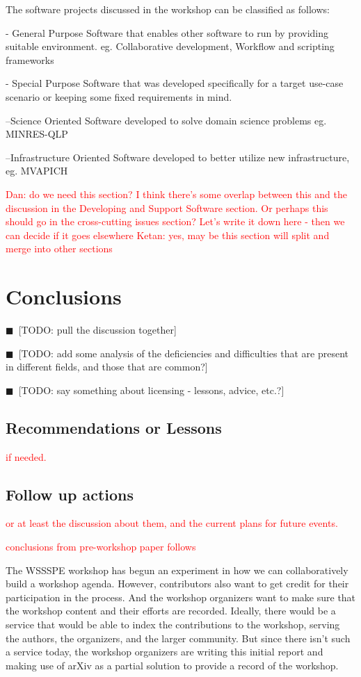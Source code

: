 \documentclass[11pt, oneside]{amsart}
\newcommand{\todo}[1]{{\color{blue}$\blacksquare$~\textsf{[TODO: #1]}}}
\newcommand{\note}[1]{ {\textcolor{red}    { #1 }}}
\begin{document}
The software projects discussed in the workshop can be classified as follows:

- General Purpose
    Software that enables other software to run by providing suitable environment. eg. Collaborative development, Workflow and scripting frameworks

- Special Purpose
Software that was developed specifically for a target use-case scenario or keeping some fixed requirements in mind.
 
--Science Oriented
      Software developed to solve domain science problems eg. MINRES-QLP

--Infrastructure Oriented
      Software developed to better utilize new infrastructure, eg. MVAPICH

\note{Dan: do we need this section?  I think there's some overlap
  between this and the discussion in the Developing and Support
  Software section.  Or perhaps this should go in the cross-cutting
  issues section?  Let's write it down here - then we can decide if it goes elsewhere}
\note{Ketan: yes, may be this section will split and merge into other sections}

\section{Conclusions} \label{sec:conclusions}


\todo{pull the discussion together}

\todo{add some analysis of the deficiencies and difficulties that are
  present in different fields, and those that are common?}

\todo{say something about licensing - lessons, advice, etc.?}

\subsection{Recommendations or Lessons}

\note{if needed.}

\subsection{Follow up actions}

\note{or at least the discussion about them, and the current plans for
  future events.}

\note{conclusions from pre-workshop paper follows}

The WSSSPE workshop has begun an experiment in how we can
collaboratively build a workshop agenda. However, contributors also
want to get credit for their participation in the process. And the
workshop organizers want to make sure that the workshop content and
their efforts are recorded.  Ideally, there would be a service that
would be able to index the contributions to the workshop, serving the
authors, the organizers, and the larger community. But since there
isn't such a service today, the workshop organizers are writing this
initial report and making use of arXiv as a partial solution to
provide a record of the workshop.
\end{document}
